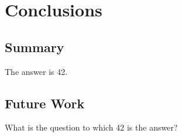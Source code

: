 \chapter{Conclusions}

\section{Summary}

The answer is 42.

\section{Future Work}

What is the question to which 42 is the answer?
